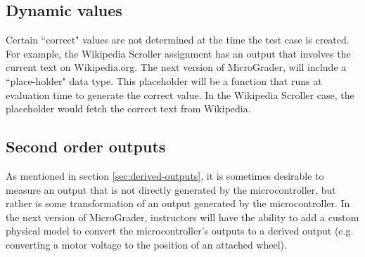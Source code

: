 \documentclass[12pt]{article}
\begin{document}
\subsection{Dynamic values}
Certain ``correct" values are not determined at the time the test case is created.  For example, the Wikipedia Scroller assignment has an output that involves the current text on Wikipedia.org.  The next version of MicroGrader, will include a ``place-holder" data type.  This placeholder will be a function that runs at evaluation time to generate the correct value.  In the Wikipedia Scroller case, the placeholder would fetch the correct text from Wikipedia.

\subsection{Second order outputs}
As mentioned in section \ref{sec:derived-outputs}, it is sometimes desirable to measure an output that is not directly generated by the microcontroller, but rather is some transformation of an output generated by the microcontroller.  In the next version of MicroGrader, instructors will have the ability to add a custom physical model to convert the microcontroller's outputs to a derived output (e.g. converting a motor voltage to the position of an attached wheel).
\end{document}
